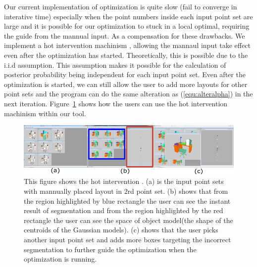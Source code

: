 Our current implementation of optimization is quite slow (fail to converge in interative  time) especially when the point numbers inside each input point set are large and it is possible for our optimization to stuck in a local optimal, requiring the guide from the mannual  input. As a compensation for these drawbacks. We implement a hot intervention machinism , allowing the mannaul  input take effect even after the optimization has started. Theoretically, this is possible due to the i.i.d assumption. 
This assumption makes it possible for the calculation of posterior probability being independent for each input point set. Even after the optimization is started, we can still allow the user to add more layouts for other point sets and the program can do the same alteration as (\ref{equ:alteralpha}) in the next iteration. Figure~\ref{fig:hi} shows how the users can use the hot intervention machinism  within our tool.
\begin{figure}[htb]
	\centering
	\includegraphics[width=\linewidth]{images/hotintervention/hi}
	\caption{\label{fig:hi}This figure shows the hot intervention . (a) is the input point sets with mannually  placed layout in 2rd  point set. (b) shows that from the region highlighted by blue rectangle the user can see the instant result of segmentation and from the region highlighted by the red rectangle the user can see the space of object model(the shape of the centroids of the Gaussian models). (c) shows that the user picks another input point set and adds more boxes targeting the incorrect segmentation to further guide the optimization when the optimization is running.}
\end{figure}
 